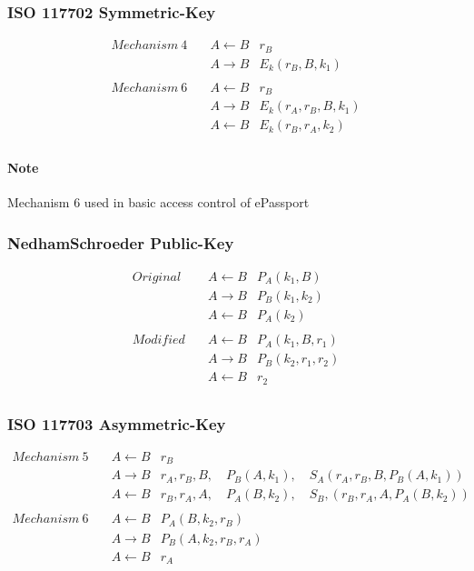 \subsubsection{ISO 11770\text{-}2 Symmetric-Key}
\begin{eqnarray*}
    Mechanism~4 \quad &  A \leftarrow B & r_B \\
                      & A \rightarrow B & E_k(r_B,B,k_1) \\
    \\
    Mechanism~6 \quad & A \leftarrow B & r_B \\
                      & A \rightarrow B & E_k(r_A,r_B,B,k_1) \\
                      & A \leftarrow B & E_k(r_B,r_A,k_2) \\
\end{eqnarray*}

\paragraph{Note}
Mechanism 6 used in basic access control of ePassport

\subsubsection{Nedham\text{-}Schroeder Public-Key}
\begin{eqnarray*}
    Original \quad &  A \leftarrow B & P_A(k_1,B)  \\
                   & A \rightarrow B &  P_B(k_1,k_2) \\
                   & A \leftarrow B & P_A(k_2) \\
    \\
    Modified \quad &  A \leftarrow B & P_A(k_1, B, r_1)  \\
                   & A \rightarrow B & P_B(k_2,r_1,r_2) \\
                   & A \leftarrow B & r_2 \\
\end{eqnarray*}

\subsubsection{ISO 11770\text{-}3 Asymmetric-Key}
\begin{eqnarray*}
    Mechanism~5 \quad &  A \leftarrow B & r_B \\
                      & A \rightarrow B & r_A,r_B,B, \quad P_B(A,k_1),
    \quad S_A(r_A,r_B,B,P_B(A,k_1))\\
    & A \leftarrow B &
    r_B,r_A,A, \quad P_A(B,k_2), \quad S_B,(r_B,r_A,A,P_A(B,k_2))\\
    \\
    Mechanism~6 \quad &  A \leftarrow B & P_A(B,k_2,r_B) \\
                      & A \rightarrow B & P_B(A,k_2,r_B,r_A) \\
                      & A \leftarrow B & r_A 
\end{eqnarray*}

